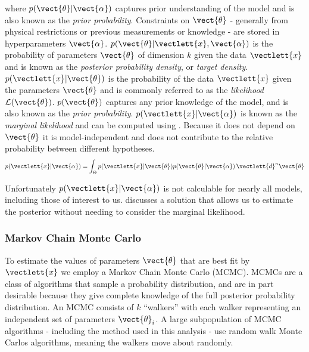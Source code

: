 \noindent where $p(\vect{\theta}|\vect{\alpha})$ captures prior understanding of the
model and is also known as the
\textit{prior probability}.  Constraints on $\vect{\theta}$ - generally from physical restrictions or previous measurements or
knowledge - are stored in hyperparameters $\vect{\alpha}$.  $p(\vect{\theta}|\vectlett{x}, \vect{\alpha})$ is the probability of
parameters $\vect{\theta}$ of dimension $k$ given the
data $\vectlett{x}$ and is known as the \textit{posterior probability density}, or \textit{target
density}.  $p(\vectlett{x}|\vect{\theta})$ is the probability of the data $\vectlett{x}$ given the parameters
$\vect{\theta}$ and is
commonly referred to as the \textit{likelihood} $\mathcal{L}(\vect{\theta})$.  $p(\vect{\theta})$ captures any prior knowledge of the
model, and is also known as the \textit{prior probability}.  $p(\vectlett{x}|\vect{\alpha})$ is known as the \textit{marginal likelihood}
and can be computed using .  Because it does not depend on
$\vect{\theta}$ it is model-independent and does not contribute to the relative probability between different
hypotheses.
\begin{equation}
p(\vectlett{x}|\vect{\alpha}) = \int_{\Theta} p(\vectlett{x}|\vect{\theta}) p(\vect{\theta}|\vect{\alpha})\, \vectlett{d}^n \vect{\theta}
\label{eq:er_nr_calibrations_parameter_determ_mc_match_p_data}
\end{equation}

Unfortunately $p(\vectlett{x}|\vect{\alpha})$ is not calculable for nearly all models, including those of interest to
us.   discusses a solution that allows us to estimate the posterior without
needing to consider the marginal likelihood.



\subsubsection{Markov Chain Monte Carlo}
\label{subsubsec:er_nr_calibrations_parameter_determ_mcmc}
To estimate the values of parameters $\vect{\theta}$ that are best fit by $\vectlett{x}$ we employ a Markov Chain
Monte Carlo (MCMC).  MCMCs are a class of algorithms that sample a probability distribution, and are in part desirable because they
give complete knowledge of the full posterior probability
distribution.  An MCMC consists of $k$ ``walkers'' with each walker representing an independent set of parameters $\vect{\theta}_i$.  A
large
subpopulation of MCMC algorithms - including the method used in this analysis - use random walk Monte Carlos algorithms, meaning the
walkers move about randomly.

